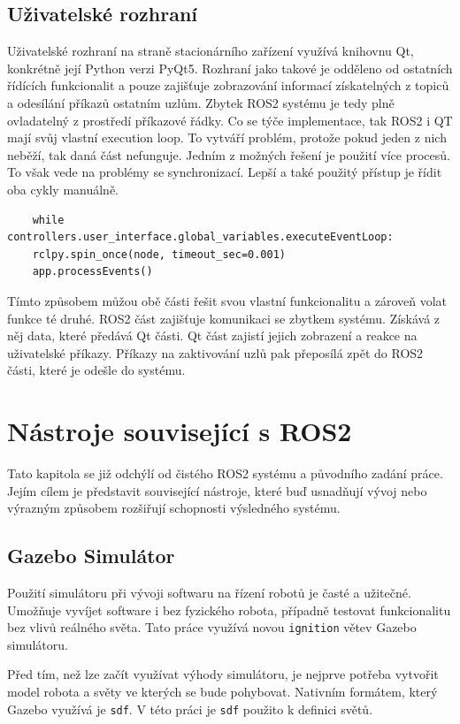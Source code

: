 \newpage
\section{Uživatelské rozhraní}
Uživatelské rozhraní na straně stacionárního zařízení využívá knihovnu Qt, konkrétně její Python verzi PyQt5. Rozhraní jako takové je odděleno od ostatních řídících funkcionalit a pouze zajišťuje zobrazování informací získatelných z topiců a odesílání příkazů ostatním uzlům. Zbytek ROS2 systému je tedy plně ovladatelný z prostředí příkazové řádky. Co se týče implementace, tak ROS2 i QT mají svůj vlastní execution loop. To vytváří problém, protože pokud jeden z nich neběží, tak daná část nefunguje. Jedním z možných řešení je použití více procesů. To však vede na problémy se synchronizací. Lepší a také použitý přístup je řídit oba cykly manuálně. 
\begin{verbatim}
	while controllers.user_interface.global_variables.executeEventLoop:
	rclpy.spin_once(node, timeout_sec=0.001)
	app.processEvents()
\end{verbatim}
Tímto způsobem můžou obě části řešit svou vlastní funkcionalitu a zároveň volat funkce té druhé. ROS2 část zajišťuje komunikaci se zbytkem systému. Získává z něj data, které předává Qt části. Qt část zajistí jejich zobrazení a reakce na uživatelské příkazy. Příkazy na zaktivování uzlů pak přeposílá zpět do ROS2 části, které je odešle do systému.

\chapter{Nástroje související s ROS2}
Tato kapitola se již odchýlí od čistého ROS2 systému a původního zadání práce. Jejím cílem je představit související nástroje, které buď usnadňují vývoj nebo výrazným způsobem rozšiřují schopnosti výsledného systému.

\section{Gazebo Simulátor}
Použití simulátoru při vývoji softwaru na řízení robotů je časté a užitečné. Umožňuje vyvíjet software i bez fyzického robota, případně testovat funkcionalitu bez vlivů reálného světa. Tato práce využívá novou \verb|ignition| větev Gazebo simulátoru. 

Před tím, než lze začít využívat výhody simulátoru, je nejprve potřeba vytvořit model robota a světy ve kterých se bude pohybovat. Nativním formátem, který Gazebo využívá je \verb|sdf|. V této práci je \verb|sdf| použito k definici světů.

